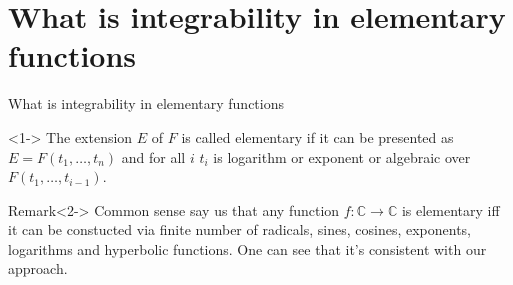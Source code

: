 \documentclass[8pt]{beamer}
\renewcommand{\C}{\ensuremath{\mathbb{C}}}
\renewcommand{\|}{\ensuremath{\hspace{0.1cm} | \hspace{0.1cm}}}
\begin{document}
\section{What is integrability in elementary functions}
\begin{frame}{What is integrability in elementary functions}
    \begin{definition}<1->
        The extension $E$ of $F$ is called elementary if it can be presented as $E = F(t_1, \ldots, t_n)$ and for all $i$ $t_i$ is logarithm or exponent or algebraic over $F(t_1, \ldots, t_{i-1})$.
    \end{definition}
    \begin{block}{Remark}<2->
        Common sense say us that any function $f: \C \to \C$ is elementary iff it can be constucted via finite number of radicals, sines, cosines, exponents, logarithms and hyperbolic functions.
        One can see that it's consistent with our approach.
    \end{block}
\end{frame}
\end{document}
